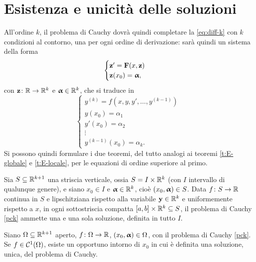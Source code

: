 \section{Esistenza e unicità delle soluzioni}
All'ordine $k$, il problema di Cauchy dovrà quindi completare la \eqref{eq:diff-k} con $k$ condizioni al contorno, una per ogni ordine di derivazione: sarà quindi un sistema della forma
\begin{equation}
\begin{cases}
\mathbf{z}'=\mathbf{F}(x,\mathbf{z})\\\mathbf{z}(x_0)=\bm{\upalpha},
\end{cases}
\end{equation}
con $\mathbf{z}\colon\mathbb{R}\to\mathbb{R}^k$ e $\bm{\upalpha}\in\mathbb{R}^k$, che si traduce in
\begin{equation} \label{pck}
\begin{cases}
y^{(k)}=f(x,y,y',\dots,y^{(k-1)})\\
y(x_0)=\alpha_1\\
y'(x_0)=\alpha_2\\
\vdots\\
y^{(k-1)}(x_0)=\alpha_k.
\end{cases}
\end{equation}
Si possono quindi formulare i due teoremi, del tutto analogi ai teoremi \ref{t:E-globale} e \ref{t:E-locale}, per le equazioni di ordine superiore al primo.

\begin{teorema}
Sia $S\subseteq\mathbb{R}^{k+1}$ una striscia verticale, ossia $S=I\times\mathbb{R}^k$ (con $I$ intervallo di qualunque genere), e siano $x_0\in I$ e $\bm{\upalpha}\in\mathbb{R}^k$, cioè $(x_0,\bm{\upalpha})\in S$. Data $f\colon S\to\mathbb{R}$ continua in $S$ e lipschitziana rispetto alla variabile $\mathbf{y}\in\mathbb{R}^k$ e uniformemente rispetto a $x$, in ogni sottostriscia compatta $[a,b]\times\mathbb{R}^k\subseteq S$, il problema di Cauchy \eqref{pck} ammette una e una sola soluzione, definita in tutto $I$.
\end{teorema}
\begin{teorema}
Siano $\Omega\subseteq\mathbb{R}^{k+1}$ aperto, $f\colon\Omega\to\mathbb{R}$, $(x_0,\bm{\upalpha})\in\Omega$, con il problema di Cauchy \eqref{pck}. Se $f\in\mathcal{C}^{{1}}(\Omega)$, esiste un opportuno intorno di $x_0$ in cui è definita una soluzione, unica, del problema di Cauchy.
\end{teorema}

